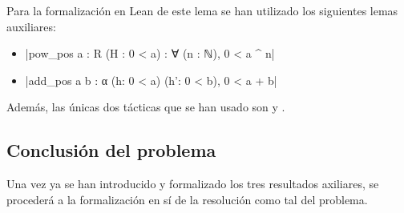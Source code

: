 Para la formalización en Lean de este lema se han utilizado los
siguientes lemas auxiliares:
\begin{itemize}
\item {}|pow_pos {a : R} (H : 0 < a) : ∀ (n : ℕ), 0 < a ^ n|
\item {}|add_pos {a b : α} (h: 0 < a) (h': 0 < b), 0 < a + b|
\end{itemize}

Además, las únicas dos tácticas que se han usado son
 y
.


\subsection{Conclusión del problema}
Una vez ya se han introducido y formalizado los tres resultados
axiliares, se procederá a la formalización en sí de la resolución
como tal del problema.